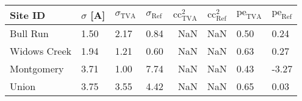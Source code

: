 \begin{tabular}{llllrrll}
\toprule
Site ID & $\sigma$ [A] & $\sigma_\text{TVA}$ & $\sigma_\text{Ref}$ & $\text{cc}^2_\text{TVA}$ & $\text{cc}^2_\text{Ref}$ & $\text{pe}_\text{TVA}$ & $\text{pe}_\text{Ref}$ \\
\midrule
Bull Run & 1.50 & 2.17 & 0.84 & NaN & NaN & 0.50 & 0.24 \\
Widows Creek & 1.94 & 1.21 & 0.60 & NaN & NaN & 0.63 & 0.27 \\
Montgomery & 3.71 & 1.00 & 7.74 & NaN & NaN & 0.43 & -3.27 \\
Union & 3.75 & 3.55 & 4.42 & NaN & NaN & 0.65 & 0.03 \\
\bottomrule
\end{tabular}
